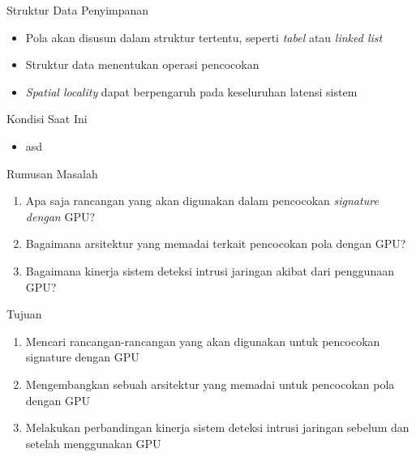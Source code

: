 \documentclass[10pt]{beamer}
\begin{document}
\begin{frame}[fragile]{Struktur Data Penyimpanan}
    \begin{itemize}

        \item Pola akan disusun dalam struktur tertentu, seperti \emph{tabel} atau \emph{linked list}
        
        \item Struktur data menentukan operasi pencocokan

        \item \emph{Spatial locality} dapat berpengaruh pada keseluruhan latensi sistem

    \end{itemize}
\end{frame}

\begin{frame}[fragile]{Kondisi Saat Ini}
    \begin{itemize}

        \item asd

    \end{itemize}
\end{frame}

\begin{frame}[fragile]{Rumusan Masalah}
    \begin{enumerate}

        \item Apa saja rancangan yang akan digunakan dalam pencocokan \emph{signature dengan} GPU?

        \item Bagaimana arsitektur yang memadai terkait pencocokan pola dengan GPU?

        \item Bagaimana kinerja sistem deteksi intrusi jaringan akibat dari penggunaan GPU?

    \end{enumerate}
\end{frame}

\begin{frame}[fragile]{Tujuan}
    \begin{enumerate}
        
        \item Mencari rancangan-rancangan yang akan digunakan untuk pencocokan signature dengan GPU
        
        \item Mengembangkan sebuah arsitektur yang memadai untuk pencocokan pola dengan GPU
        
        \item Melakukan perbandingan kinerja sistem deteksi intrusi jaringan sebelum dan setelah menggunakan GPU

    \end{enumerate}
\end{frame}
\end{document}
